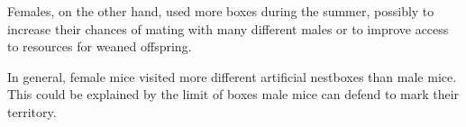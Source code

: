 Females, on the other hand, used more boxes during the summer, possibly to increase their chances of mating with many different males or to improve access to resources for weaned offspring.

In general, female mice visited more different artificial nestboxes than male mice. This could be explained by the limit of boxes male mice can defend to mark their territory.
